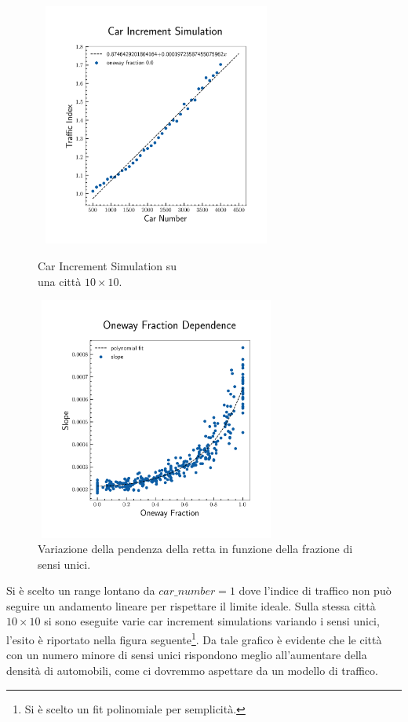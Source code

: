 \documentclass[main.tex]{subfiles}
\begin{document}
        \begin{figure}[H]
            \begin{minipage}{.5\textwidth}
                \centering
                \includegraphics[width=8cm, height=8cm]{car_increment.png}
                \caption{Car Increment Simulation su\\ una città $10 \times 10$.}
                \label{fig:9}
            \end{minipage}
            \begin{minipage}{.5\textwidth}
                \centering
                \includegraphics[width=8cm, height=8cm]{oneway_fraction_dependence.png}
                \caption{Variazione della pendenza della retta in funzione della frazione di sensi unici.}
                \label{fig:8}
            \end{minipage}
        \end{figure}

        Si è scelto un range lontano da $car\_number = 1$ dove l'indice di traffico non può seguire un andamento lineare per rispettare il limite ideale.
        Sulla stessa città $10 \times 10$ si sono eseguite varie car increment simulations variando i sensi unici, l'esito è riportato nella figura seguente\footnote{Si è scelto un fit polinomiale per semplicità.}.
        Da tale grafico è evidente che le città con un numero minore di sensi unici rispondono meglio all'aumentare della densità di automobili, come ci dovremmo
        aspettare da un modello di traffico.
\end{document}
